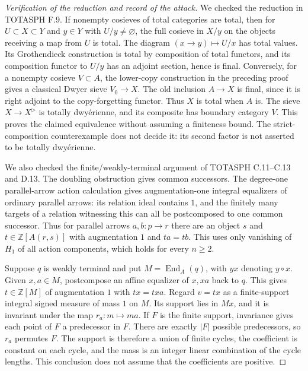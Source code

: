 \documentclass[11pt,a4paper]{article}
\theoremstyle{definition}
\theoremstyle{remark}
\begin{document}
\begin{proof}[Verification of the reduction and record of the attack]
We checked the reduction in TOTASPH F.9. If nonempty cosieves of total categories are total, then for $U\subset X\subset Y$ and $y\in Y$ with $U/y\ne\varnothing$, the full cosieve in $X/y$ on the objects receiving a map from $U$ is total. The diagram $(x\to y)\mapsto U/x$ has total values. Its Grothendieck construction is total by composition of total functors, and its composition functor to $U/y$ has an adjoint section, hence is final. Conversely, for a nonempty cosieve $V\subset A$, the lower-copy construction in the preceding proof gives a classical Dwyer sieve $V_0\to X$. The old inclusion $A\to X$ is final, since it is right adjoint to the copy-forgetting functor. Thus $X$ is total when $A$ is. The sieve $X\to X^{\triangleright}$ is totally dwy\'erienne, and its composite has boundary category $V$. This proves the claimed equivalence without assuming a finiteness bound. The strict-composition counterexample does not decide it: its second factor is not asserted to be totally dwy\'erienne.

We also checked the finite/weakly-terminal argument of TOTASPH C.11--C.13 and D.13. The doubling obstruction gives common successors. The degree-one parallel-arrow action calculation gives augmentation-one integral equalizers of ordinary parallel arrows: its relation ideal contains $1$, and the finitely many targets of a relation witnessing this can all be postcomposed to one common successor. Thus for parallel arrows $a,b:p\to r$ there are an object $s$ and $t\in\mathbb Z[A(r,s)]$ with augmentation $1$ and $ta=tb$. This uses only vanishing of $H_1$ of all action components, which holds for every $n\geq2$.

Suppose $q$ is weakly terminal and put $M=\operatorname{End}_A(q)$, with $yx$ denoting $y\circ x$. Given $x,a\in M$, postcompose an affine equalizer of $x,xa$ back to $q$. This gives $t\in\mathbb Z[M]$ of augmentation $1$ with $tx=txa$. Regard $v=tx$ as a finite-support integral signed measure of mass $1$ on $M$. Its support lies in $Mx$, and it is invariant under the map $r_a:m\mapsto ma$. If $F$ is the finite support, invariance gives each point of $F$ a predecessor in $F$. There are exactly $|F|$ possible predecessors, so $r_a$ permutes $F$. The support is therefore a union of finite cycles, the coefficient is constant on each cycle, and the mass is an integer linear combination of the cycle lengths. This conclusion does not assume that the coefficients are positive.


\end{proof}
\end{document}
